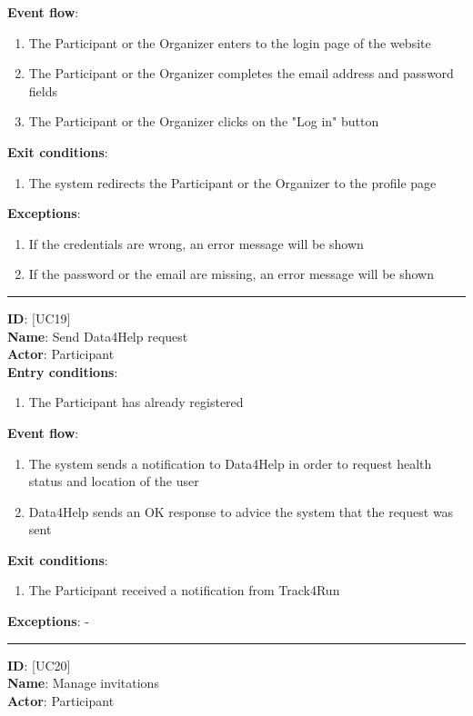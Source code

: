 \documentclass[a4paper, hidelinks, 12pt]{report}
\newcommand\usecase[1]{ [UC#1] }
\begin{document}
\begin{itemize}
		\textbf{Event flow}:
		\begin{enumerate}
			\item{The Participant or the Organizer enters to the login page of the website}
			\item{The Participant or the Organizer completes the email address and password fields}
			\item{The Participant or the Organizer clicks on the "Log in" button}
		\end{enumerate}
		\textbf{Exit conditions}:
		\begin{enumerate}
			\item{The system redirects the Participant or the Organizer to the profile page}
		\end{enumerate}
		\textbf{Exceptions}:
		\begin{enumerate}
			\item{If the credentials are wrong, an error message will be shown}
			\item{If the password or the email are missing, an error message will be shown}
		\end{enumerate}
		\rule{\linewidth}{0.4pt}
		\textbf{ID}: \usecase{19} \\
		\textbf{Name}: Send Data4Help request \\
		\textbf{Actor}: Participant \\
		\textbf{Entry conditions}:
		\begin{enumerate}
			\item{The Participant has already registered}
		\end{enumerate}
		\textbf{Event flow}:
		\begin{enumerate}
			\item{The system sends a notification to Data4Help in order to request health status and location of the user}
			\item{Data4Help sends an OK response to advice the system that the request was sent}
		\end{enumerate}
		\textbf{Exit conditions}:
		\begin{enumerate}
			\item{The Participant received a notification from Track4Run}
		\end{enumerate}
		\textbf{Exceptions}: - \\
		\rule{\linewidth}{0.4pt}
		\textbf{ID}: \usecase{20} \\
		\textbf{Name}: Manage invitations \\
		\textbf{Actor}: Participant \\

\end{itemize}
\end{document}
